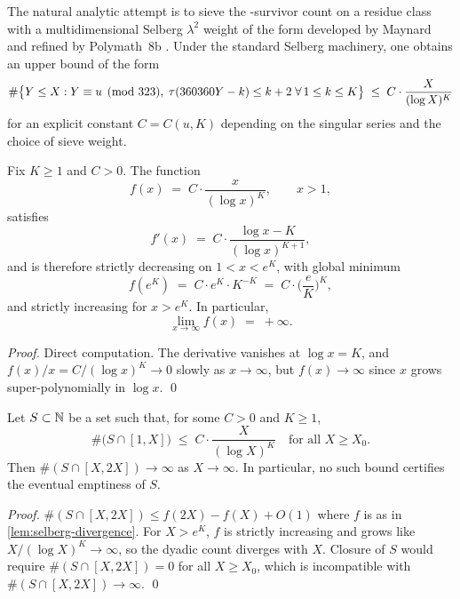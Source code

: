 The natural analytic attempt is to sieve the \PLEclass-survivor count
on a residue class with a multidimensional Selberg $\lambda^2$ weight
of the form developed by Maynard \cite{Maynard2013} and refined by
Polymath~8b \cite{Polymath8b2014}. Under the standard Selberg
machinery, one obtains an upper bound of the form
\[
\#\bigl\{ Y \le X : Y \equiv u \pmod{323}, \;
\tau(360360 Y - k) \le k + 2 \;\forall\, 1 \le k \le K \bigr\}
\;\le\; C \cdot \frac{X}{(\log X)^K}
\]
for an explicit constant $C = C(u, K)$ depending on the singular
series and the choice of sieve weight.

\begin{lemma}
\label{lem:selberg-divergence}
Fix $K \ge 1$ and $C > 0$. The function
\[
f(x) \;=\; C \cdot \frac{x}{(\log x)^K}, \qquad x > 1,
\]
satisfies
\[
f'(x) \;=\; C \cdot \frac{\log x - K}{(\log x)^{K+1}} ,
\]
and is therefore strictly decreasing on $1 < x < e^K$, with global
minimum
\[
f(e^K) \;=\; C \cdot e^K \cdot K^{-K} \;=\; C \cdot \biggl( \frac{e}{K} \biggr)^{K},
\]
and strictly increasing for $x > e^K$. In particular,
\[
\lim_{x \to \infty} f(x) \;=\; +\infty .
\]
\end{lemma}

\begin{proof}
Direct computation. The derivative vanishes at $\log x = K$, and
$f(x) / x = C / (\log x)^K \to 0$ slowly as $x \to \infty$, but
$f(x) \to \infty$ since $x$ grows super-polynomially in $\log x$.
\qed
\end{proof}

\begin{corollary}
\label{cor:sparsity-not-closure}
Let $S \subset \mathbb{N}$ be a set such that, for some $C > 0$ and $K \ge 1$,
\[
\#\bigl( S \cap [1, X] \bigr) \;\le\; C \cdot \frac{X}{(\log X)^K}
\quad \text{for all } X \ge X_0 .
\]
Then $\#(S \cap [X, 2X]) \to \infty$ as $X \to \infty$. In
particular, no such bound certifies the eventual emptiness of $S$.
\end{corollary}

\begin{proof}
$\#(S \cap [X, 2X]) \le f(2X) - f(X) + O(1)$ where $f$ is as in
\cref{lem:selberg-divergence}. For $X > e^K$, $f$ is strictly
increasing and grows like $X / (\log X)^K \to \infty$, so the
dyadic count diverges with $X$. Closure of $S$ would require
$\#(S \cap [X, 2X]) = 0$ for all $X \ge X_0$, which is incompatible
with $\#(S \cap [X, 2X]) \to \infty$.
\qed
\end{proof}

